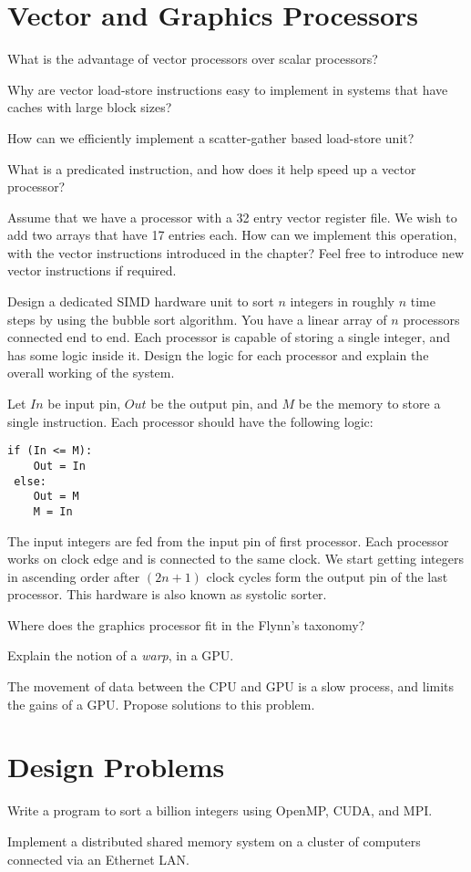 \section*{Vector and Graphics Processors}

\begin{ExerciseList}

\Exercise
What is the advantage of vector processors over scalar processors?

\Exercise
Why are vector load-store instructions easy to implement in systems that have caches with large block sizes?

\Exercise
How can we efficiently implement a scatter-gather based load-store unit?

\Exercise
What is a predicated instruction, and how does it help speed up a vector processor?

\Exercise[difficulty=1]
Assume that we have a processor with a 32 entry vector register file. We wish to add two arrays that have
17 entries each. How can we implement this operation, with the \simplerisc vector instructions introduced
in the chapter? Feel free to introduce new vector instructions if required.

\Exercise[difficulty=1]
Design a dedicated SIMD hardware unit to sort $n$ integers in roughly $n$ time steps by using the bubble
sort algorithm. You have a linear array of $n$ 
processors connected end to end. Each processor is capable of storing a single integer, and has some logic inside it. Design
the logic for each processor and explain the overall working of the system.

\Answer
Let $In$ be input pin, $Out$ be the output pin, and $M$ be the memory to store a single instruction. Each processor should have 
the following logic:
\begin{Verbatim}[frame = single]
 if (In <= M):
    Out = In
 else:
    Out = M
    M = In
\end{Verbatim}

The input integers are fed from the input pin of first processor. Each processor works on clock edge and is connected to the same clock.
We start getting integers in ascending order after $(2n+1)$ clock cycles form the output pin of the last processor. This hardware is
also known as systolic sorter.

\Exercise
Where does the graphics processor fit in the Flynn's taxonomy?

\Exercise
Explain the notion of a {\em warp}, in a GPU.

\Exercise[difficulty=1]
The movement of data between the CPU and GPU is a slow process, and limits the
gains of a GPU. Propose solutions to this problem.

\end{ExerciseList}

\section*{Design Problems}

\begin{ExerciseList}
\Exercise
Write a program to sort a billion integers using OpenMP, CUDA, and MPI. 

\Exercise
Implement a distributed shared memory system on a cluster of computers 
connected via an Ethernet LAN.
\end{ExerciseList}
